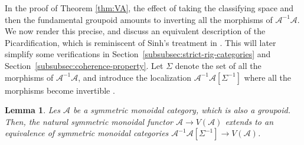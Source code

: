 \documentclass[JEP,XML,SOM,Unicode,published]{cedram}
\theoremstyle{plain}
\newtheorem{lemma}[theorem]{Lemma}
\theoremstyle{definition}
\newcommand{\Acal}{\mathcal A}
\begin{document}
In the proof of Theorem \ref{thm:VA}, the effect of taking the classifying space and then the fundamental groupoid amounts to inverting all the morphisms of $\Acal^{-1}\Acal$. We now render this precise, and discuss an equivalent description of the Picardification, which is reminiscent of Sinh's treatment in \cite[Chap.\,III]{Sinh-these}. This will later simplify some verifications in Section~\ref{subsubsec:strict-rig-categories} and Section~\ref{subsubsec:coherence-property}. Let $\Sigma$ denote the set of all the morphisms of $\Acal^{-1}\Acal$, and introduce the localization $\Acal^{-1}\Acal[\Sigma^{-1}]$ where all the morphisms become invertible \cite[Chap.\,I]{Gabriel-Zisman}.
\begin{lemma}\label{lemma:VA-tilde}
Les $\Acal$ be a symmetric monoidal category, which is also a groupoid. Then, the natural symmetric monoidal functor $\Acal\to V(\Acal)$ extends to an equivalence of symmetric monoidal categories $\Acal^{-1}\Acal[\Sigma^{-1}]\to V(\Acal)$.
\end{lemma}
\end{document}
